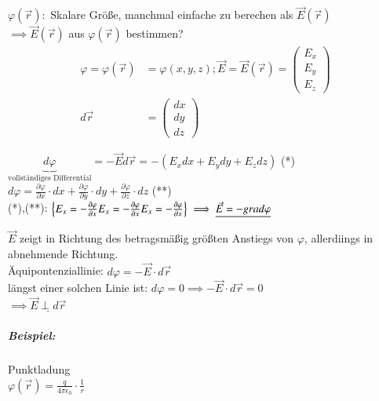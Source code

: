 \documentclass[11pt]{article}
\begin{document}
$ \varphi(\vec{r}): $ Skalare Grö\ss{}e, manchmal einfache zu berechen als $ \vec{E}(\vec{r}) $\\

$\implies \vec{E}(\vec{r}) $ aus $ \varphi(\vec{r}) $ bestimmen?\\

\begin{align*}
	\varphi=\varphi(\vec{r}) &= \varphi(x,y,z); \vec{E}= \vec{E}(\vec{r})=\begin{pmatrix}E_x\\ E_y\\ E_z\end{pmatrix}\\
	d\vec{r}&= \begin{pmatrix}dx\\ dy\\ dz\end{pmatrix}
\end{align*}

$ \underbrace{d\varphi}_{\text{vollständiges Differential}}= -\vec{E}d\vec{r} = - (E_xdx+E_ydy+E_zdz)$ (*) \\

$ d\varphi=\frac{\partial\varphi}{\partial x}\cdot dx +\frac{\partial\varphi}{\partial y}\cdot dy+\frac{\partial\varphi}{\partial z}\cdot dz $ (**)\\

(*),(**): \begin{math}
\left\{ E_x= -\frac{\partial\varphi}{\partial x}\\ E_x= -\frac{\partial\varphi}{\partial x}\\ E_x= -\frac{\partial\varphi}{\partial x}  \right\} \implies \underline{\vec{E}=-grad\varphi}\\ \end{math}  

$\vec{E}$ zeigt in Richtung des betragsmä\ss{}ig grö\ss{}ten Anstiegs von $\varphi$, allerdiings in abnehmende Richtung.\\

Äquipontenziallinie: $ d\varphi= -\vec{E}\cdot d\vec{r} $\\
längst einer solchen Linie ist: $ d\varphi=0\implies -\vec{E}\cdot d\vec{r}=0 $\\
$ \implies \underline{\vec{E}\perp d\vec{r}} $\\


\subparagraph{Beispiel:} Punktladung\\

$ \varphi(\vec{r})=\frac{q}{4\pi\epsilon_0}\cdot \frac{1}{r} $\\
\end{document}

